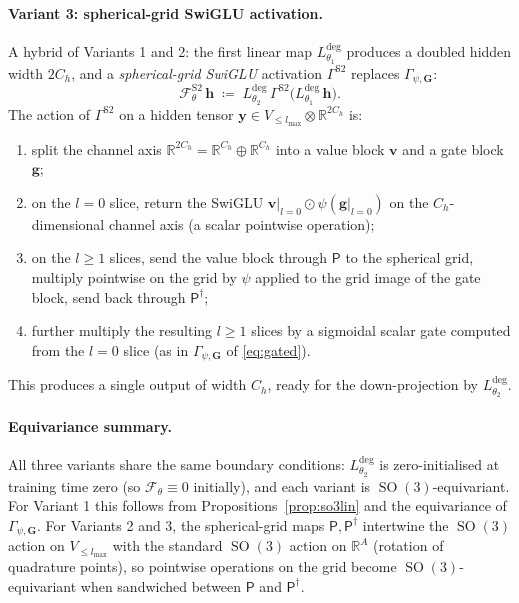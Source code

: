 \documentclass[11pt,a4paper]{article}
\DeclareMathOperator{\SO}{SO}
\newcommand{\R}{\mathbb{R}}
\newcommand{\bG}{\bm{G}}
\newcommand{\bh}{\bm{h}}
\newcommand{\lmax}{l_{\max}}
\theoremstyle{plain}
\theoremstyle{definition}
\theoremstyle{remark}
\begin{document}
\paragraph{Variant 3: spherical-grid SwiGLU activation.}
A hybrid of Variants 1 and 2: the first linear map
$L^{\mathrm{deg}}_{\theta_1}$ produces a doubled hidden width $2C_h$, and a
\emph{spherical-grid SwiGLU} activation $\Gamma^{\mathrm{S2}}$ replaces
$\Gamma_{\psi,\bG}$:
\begin{equation}\label{eq:effn-s2glu}
    \mathcal{F}_\theta^{\mathrm{S2}}\,\bh \;\coloneqq\; L^{\mathrm{deg}}_{\theta_2}\,\Gamma^{\mathrm{S2}}\!\bigl(L^{\mathrm{deg}}_{\theta_1}\,\bh\bigr).
\end{equation}
The action of $\Gamma^{\mathrm{S2}}$ on a hidden tensor $\bm{y}\in V_{\le\lmax}\otimes\R^{2C_h}$ is:
\begin{enumerate}[leftmargin=2em,label=(\alph*)]
    \item split the channel axis $\R^{2C_h}=\R^{C_h}\oplus\R^{C_h}$ into a value block
          $\bm{v}$ and a gate block $\bm{g}$;
    \item on the $l=0$ slice, return the SwiGLU $\bm{v}|_{l=0}\odot\psi(\bm{g}|_{l=0})$
          on the $C_h$-dimensional channel axis (a scalar pointwise operation);
    \item on the $l\geq 1$ slices, send the value block through $\mathsf{P}$ to the
          spherical grid, multiply pointwise on the grid by $\psi$ applied to the grid
          image of the gate block, send back through $\mathsf{P}^{\dagger}$;
    \item further multiply the resulting $l\geq 1$ slices by a sigmoidal scalar gate
          computed from the $l=0$ slice (as in $\Gamma_{\psi,\bG}$ of \eqref{eq:gated}).
\end{enumerate}
This produces a single output of width $C_h$, ready for the down-projection by $L^{\mathrm{deg}}_{\theta_2}$.

\paragraph{Equivariance summary.}
All three variants share the same boundary conditions:
$L^{\mathrm{deg}}_{\theta_2}$ is zero-initialised at training time zero (so
$\mathcal{F}_\theta\equiv 0$ initially), and each variant is
$\SO(3)$-equivariant. For Variant 1 this follows from
Propositions~\ref{prop:so3lin} and the equivariance of $\Gamma_{\psi,\bG}$. For
Variants 2 and 3, the spherical-grid maps $\mathsf{P},\mathsf{P}^{\dagger}$
intertwine the $\SO(3)$ action on $V_{\le\lmax}$ with the standard $\SO(3)$
action on $\R^A$ (rotation of quadrature points), so pointwise operations on
the grid become $\SO(3)$-equivariant when sandwiched between $\mathsf{P}$ and
$\mathsf{P}^{\dagger}$.
\end{document}
